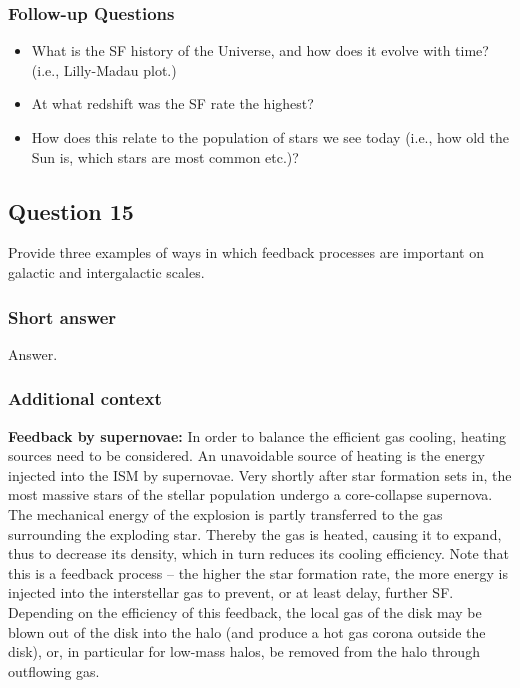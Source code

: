 \documentclass[a4paper,11pt]{article}
\begin{document}
\subsubsection{Follow-up Questions}

\begin{itemize}
    \item What is the SF history of the Universe, and how does it evolve with time? (i.e., Lilly-Madau plot.)
    \item At what redshift was the SF rate the highest?
    \item How does this relate to the population of stars we see today (i.e., how old the Sun is, which stars are most common etc.)?
\end{itemize}


\newpage
\subsection{Question 15}

Provide three examples of ways in which feedback processes are important on galactic and intergalactic scales.

\subsubsection{Short answer}

Answer.

\subsubsection{Additional context}

{\noindent}\textbf{Feedback by supernovae:} In order to balance the efficient gas cooling, heating sources need to be considered. An unavoidable source of heating is the energy injected into the ISM by supernovae. Very shortly after star formation sets in, the most massive stars of the stellar population undergo a core-collapse supernova. The mechanical energy of the explosion is partly transferred to the gas surrounding the exploding star. Thereby the gas is heated, causing it to expand, thus to decrease its density, which in turn reduces its cooling efficiency. Note that this is a feedback process -- the higher the star formation rate, the more energy is injected into the interstellar gas to prevent, or at least delay, further SF. Depending on the efficiency of this feedback, the local gas of the disk may be blown out of the disk into the halo (and produce a hot gas corona outside the disk), or, in particular for low-mass halos, be removed from the halo through outflowing gas.
\end{document}
